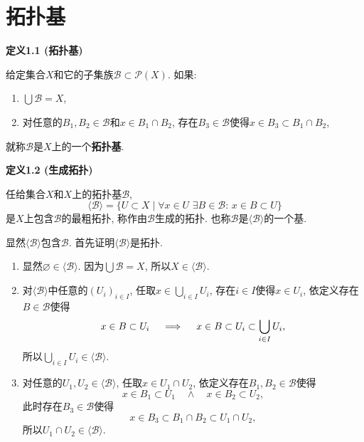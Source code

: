 


\setlength{\abovedisplayskip}{1pt}
\setlength{\belowdisplayskip}{1pt}

\section{拓扑基}

\hypertarget{sec:定义1.1}{}
\noindent\textbf{定义1.1 (拓扑基)}

给定集合$X$和它的子集族$\mathcal{B}\subset\mathcal{P}(X)$. 如果:
\vspace{3pt}
\begin{enumerate}
    \item $\displaystyle\bigcup\mathcal{B}=X$,
    \vspace{3pt}
    \item 对任意的$B_1,B_2\in\mathcal{B}$和$x\in B_1\cap B_2$,
    存在$B_3\in\mathcal{B}$使得$x\in B_3\subset B_1\cap B_2$,
\end{enumerate}
就称$\mathcal{B}$是$X$上的一个\textbf{拓扑基}.

\vspace{10pt}

\hypertarget{sec:定义1.2}{}
\noindent\textbf{定义1.2 (生成拓扑)}

任给集合$X$和$X$上的拓扑基$\mathcal{B}$,
\[
    \langle\mathcal{B}\rangle=\{U\subset X\mid
    \forall x\in U\,\,\exists B\in\mathcal{B}:\,x\in B\subset U\}
\]
是$X$上包含$\mathcal{B}$的最粗拓扑, 称作由$\mathcal{B}$生成的拓扑.
也称$\mathcal{B}$是$\langle\mathcal{B}\rangle$的一个基.


显然$\langle\mathcal{B}\rangle$包含$\mathcal{B}$.
首先证明$\langle\mathcal{B}\rangle$是拓扑.

\begin{enumerate}
    \item 显然$\varnothing\in\langle\mathcal{B}\rangle$.
    因为$\displaystyle\bigcup\mathcal{B}=X$, 所以$X\in\langle\mathcal{B}\rangle$.
    \vspace{3pt}
    \item 对$\langle\mathcal{B}\rangle$中任意的$(U_i)_{i\in I}$,
    任取$\displaystyle x\in\bigcup_{i\in I}U_i$, 存在$i\in I$使得$x\in U_i$,
    依定义存在$B\in\mathcal{B}$使得
    \vspace{3pt}
    \[
        x\in B\subset U_i\quad\implies\quad
        x\in B\subset U_i\subset\bigcup_{i\in I}U_i,\\[-3pt]
    \]
    所以$\displaystyle\bigcup_{i\in I}U_i\in\langle\mathcal{B}\rangle$.
    \vspace{3pt}
    \item 对任意的$U_1,U_2\in\langle\mathcal{B}\rangle$, 任取$x\in U_1\cap U_2$,
    依定义存在$B_1,B_2\in\mathcal{B}$使得
    \[
        x\in B_1\subset U_1\quad\land\quad x\in B_2\subset U_2,
    \]
    此时存在$B_3\in\mathcal{B}$使得
    \[
        x\in B_3\subset B_1\cap B_2\subset U_1\cap U_2,
    \]
    所以$U_1\cap U_2\in\langle\mathcal{B}\rangle$.
\end{enumerate}

